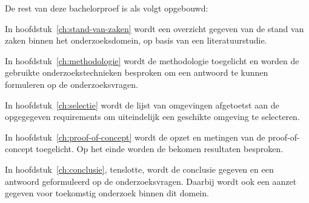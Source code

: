 De rest van deze bachelorproef is als volgt opgebouwd:

In hoofdstuk~\ref{ch:stand-van-zaken} wordt een overzicht gegeven van de stand van zaken binnen het onderzoeksdomein,
 op basis van een literatuurstudie.

In hoofdstuk~\ref{ch:methodologie} wordt de methodologie toegelicht en worden de gebruikte onderzoekstechnieken besproken om een antwoord te kunnen formuleren 
op de onderzoeksvragen.

In hoofdstuk~\ref{ch:selectie} wordt de lijst van omgevingen afgetoetst aan de opgegegeven requirements om uiteindelijk een geschikte omgeving te selecteren.

In hoofdstuk~\ref{ch:proof-of-concept} wordt de opzet en metingen van de proof-of-concept toegelicht. Op het einde worden de bekomen resultaten besproken.

In hoofdstuk~\ref{ch:conclusie}, tenslotte, 
wordt de conclusie gegeven en een antwoord geformuleerd op de onderzoeksvragen. 
Daarbij wordt ook een aanzet gegeven voor toekomstig onderzoek binnen dit domein.